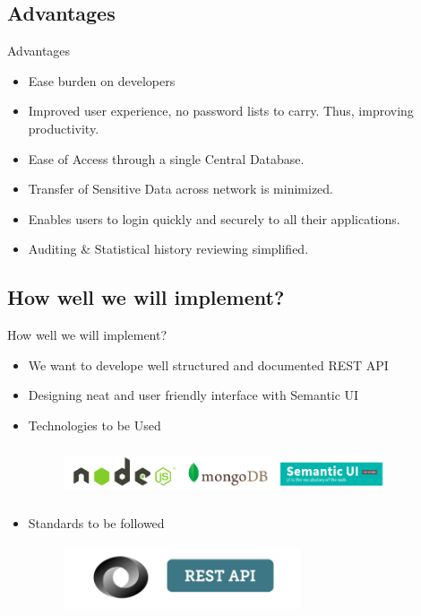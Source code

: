 \documentclass[xcolor=dvipsnames]{beamer}
\begin{document}
\subsection{Advantages}
\begin{frame}{Advantages}
\begin{itemize}
	\item Ease burden on developers
	\item Improved user experience, no password lists to carry. Thus, improving productivity.
	\item Ease of Access through a single Central Database.
	\item Transfer of Sensitive Data across network is minimized.
	\item Enables users to login quickly and securely to all their applications.
	\item Auditing \& Statistical history reviewing simplified.
\end{itemize}
\end{frame}

\subsection{How well we will implement?}
\begin{frame}{How well we will implement?}
\begin{itemize}
\item We want to develope well structured and documented REST API
\item Designing neat and user friendly interface with Semantic UI
\item Technologies to be Used
\begin{figure}
\includegraphics[width=9.5cm,height=1.5cm]{technologies}
\end{figure}
\item Standards to be followed
\begin{figure}
\includegraphics[width=7cm,height=2cm]{standards}
\end{figure}
\end{itemize}
\end{frame}
\end{document}
